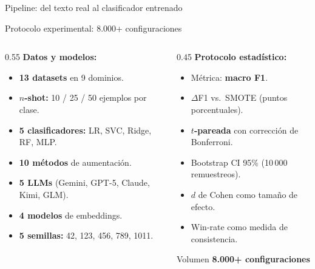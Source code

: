 \begin{frame}{Pipeline: del texto real al clasificador entrenado}
\vspace{0.5em}
\end{frame}

\begin{frame}{Protocolo experimental: 8.000+ configuraciones}
\small
\begin{columns}[T]

\begin{column}{0.55\textwidth}
\textbf{Datos y modelos:}
\begin{itemize}\setlength\itemsep{0pt}
  \item \textbf{13 datasets} en 9 dominios.
  \item \textbf{$n$-shot:} 10 / 25 / 50 ejemplos por clase.
  \item \textbf{5 clasificadores:} LR, SVC, Ridge, RF, MLP.
  \item \textbf{10 métodos} de aumentación.
  \item \textbf{5 LLMs} (Gemini, GPT-5, Claude, Kimi, GLM).
  \item \textbf{4 modelos} de embeddings.
  \item \textbf{5 semillas:} 42, 123, 456, 789, 1011.
\end{itemize}
\end{column}

\begin{column}{0.45\textwidth}
\textbf{Protocolo estadístico:}
\begin{itemize}\setlength\itemsep{0pt}
  \item Métrica: \textbf{macro F1}.
  \item $\Delta$F1 vs.\ SMOTE (puntos porcentuales).
  \item \textbf{$t$-pareada} con corrección de Bonferroni.
  \item Bootstrap CI 95\% (10\,000 remuestreos).
  \item $d$ de Cohen como tamaño de efecto.
  \item Win-rate como medida de consistencia.
\end{itemize}

\vspace{0.3em}
\begin{block}{Volumen}
\centering\bfseries\large 8.000+ configuraciones
\end{block}
\end{column}

\end{columns}
\end{frame}

